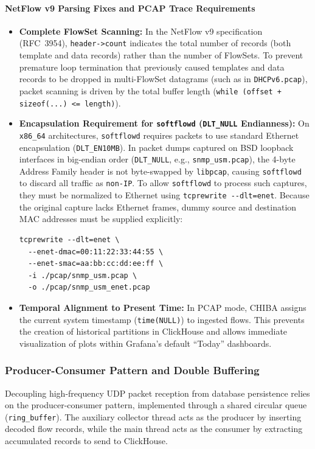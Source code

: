 \documentclass[11pt,a4paper]{article}
\newenvironment{codebox}[1][]{%
    \begin{tcolorbox}[
        colback=codebg,
        colframe=codeframe,
        boxrule=0.6pt,
        arc=1.5mm,
        left=3mm,
        right=3mm,
        top=2mm,
        bottom=2mm,
        fonttitle=\sffamily\bfseries\footnotesize,
        coltitle=chibadark,
        colbacktitle=codeframe!50!white,
        #1
    ]
}{%
    \end{tcolorbox}
}
\begin{document}
\paragraph{NetFlow v9 Parsing Fixes and PCAP Trace Requirements}
\begin{itemize}
    \item \textbf{Complete FlowSet Scanning:} In the NetFlow v9 specification (RFC~3954), \texttt{header->count} indicates the total number of records (both template and data records) rather than the number of FlowSets. To prevent premature loop termination that previously caused templates and data records to be dropped in multi-FlowSet datagrams (such as in \texttt{DHCPv6.pcap}), packet scanning is driven by the total buffer length (\texttt{while (offset + sizeof(...) <= length)}).
    \item \textbf{Encapsulation Requirement for \texttt{softflowd} (\texttt{DLT\_NULL} Endianness):} On \texttt{x86\_64} architectures, \texttt{softflowd} requires packets to use standard Ethernet encapsulation (\texttt{DLT\_EN10MB}). In packet dumps captured on BSD loopback interfaces in big-endian order (\texttt{DLT\_NULL}, e.g., \texttt{snmp\_usm.pcap}), the 4-byte Address Family header is not byte-swapped by \texttt{libpcap}, causing \texttt{softflowd} to discard all traffic as \texttt{non-IP}. To allow \texttt{softflowd} to process such captures, they must be normalized to Ethernet using \texttt{tcprewrite -{}-dlt=enet}. Because the original capture lacks Ethernet frames, dummy source and destination MAC addresses must be supplied explicitly:
\begin{codebox}
\footnotesize
\begin{verbatim}
tcprewrite --dlt=enet \
  --enet-dmac=00:11:22:33:44:55 \
  --enet-smac=aa:bb:cc:dd:ee:ff \
  -i ./pcap/snmp_usm.pcap \
  -o ./pcap/snmp_usm_enet.pcap
\end{verbatim}
\end{codebox}
    \item \textbf{Temporal Alignment to Present Time:} In PCAP mode, CHIBA assigns the current system timestamp (\texttt{time(NULL)}) to ingested flows. This prevents the creation of historical partitions in ClickHouse and allows immediate visualization of plots within Grafana's default ``Today'' dashboards.
\end{itemize}

\subsubsection{Producer-Consumer Pattern and Double Buffering}
Decoupling high-frequency UDP packet reception from database persistence relies on the producer-consumer pattern, implemented through a shared circular queue (\texttt{ring\_buffer}). The auxiliary collector thread acts as the producer by inserting decoded flow records, while the main thread acts as the consumer by extracting accumulated records to send to ClickHouse.
\end{document}
